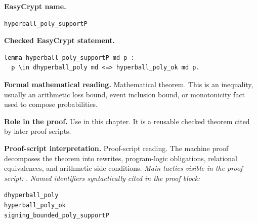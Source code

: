 \begin{formaltheorem}
\noindent\textbf{EasyCrypt name.}
\begin{lstlisting}[language=EasyCrypt,basicstyle=\ttfamily\scriptsize]
hyperball_poly_supportP
\end{lstlisting}
\noindent\textbf{Checked EasyCrypt statement.}
\begin{lstlisting}[language=EasyCrypt,basicstyle=\ttfamily\scriptsize]
lemma hyperball_poly_supportP md p :
  p \in dhyperball_poly md <=> hyperball_poly_ok md p.
\end{lstlisting}
\noindent\textbf{Formal mathematical reading.}
Mathematical theorem. This is an inequality, usually an arithmetic loss bound, event inclusion bound, or monotonicity fact used to compose probabilities.

\noindent\textbf{Role in the proof.}
Use in this chapter. It is a reusable checked theorem cited by later proof scripts.

\noindent\textbf{Proof-script interpretation.}
Proof-script reading. The machine proof decomposes the theorem into rewrites, program-logic obligations, relational equivalences, and arithmetic side conditions.
\emph{Main tactics visible in the proof script:} .
\emph{Named identifiers syntactically cited in the proof block:}
\begin{lstlisting}[language=EasyCrypt,basicstyle=\ttfamily\scriptsize]
dhyperball_poly
hyperball_poly_ok
signing_bounded_poly_supportP
\end{lstlisting}

\end{formaltheorem}

